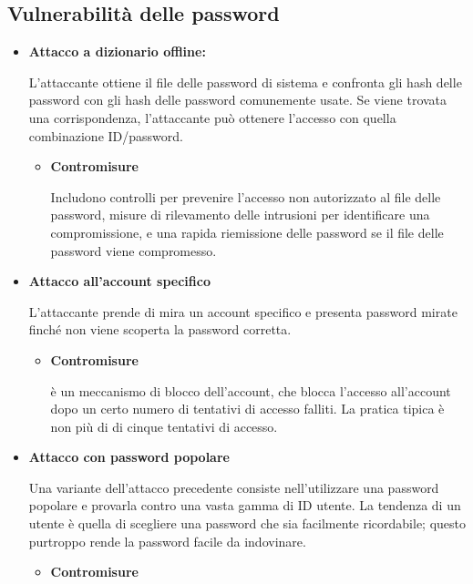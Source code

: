\subsection{Vulnerabilità delle password}
\begin{itemize}
    \item \textbf{Attacco a dizionario offline:}
    
L'attaccante ottiene il file delle password di sistema e confronta gli hash delle password con gli hash delle password comunemente usate. Se viene trovata una corrispondenza, l'attaccante può ottenere l'accesso con quella combinazione ID/password.

        \begin{itemize}
            \item \textbf{Contromisure} 
            
            Includono controlli per prevenire l'accesso non autorizzato al file delle password, misure di rilevamento delle intrusioni per identificare una compromissione, e una rapida riemissione delle password se il file delle password viene compromesso.
            
        \end{itemize}

\item \textbf{Attacco all'account specifico}

L'attaccante prende di mira un account specifico e presenta password mirate finché non viene scoperta la password corretta.

    \begin{itemize}
        \item \textbf{Contromisure} 
        
        è un meccanismo di blocco dell'account, che blocca l'accesso all'account dopo un certo numero di tentativi di accesso falliti. La pratica tipica è non più di di cinque tentativi di accesso.
        
    \end{itemize}

\item \textbf{Attacco con password popolare}

Una variante dell'attacco precedente consiste nell'utilizzare una password popolare e provarla contro una vasta gamma di ID utente. La tendenza di un utente è quella di scegliere una password che sia facilmente ricordabile; questo purtroppo rende la password facile da indovinare.

    \begin{itemize}
        \item \textbf{Contromisure} 
        

\end{itemize}
\end{itemize}
